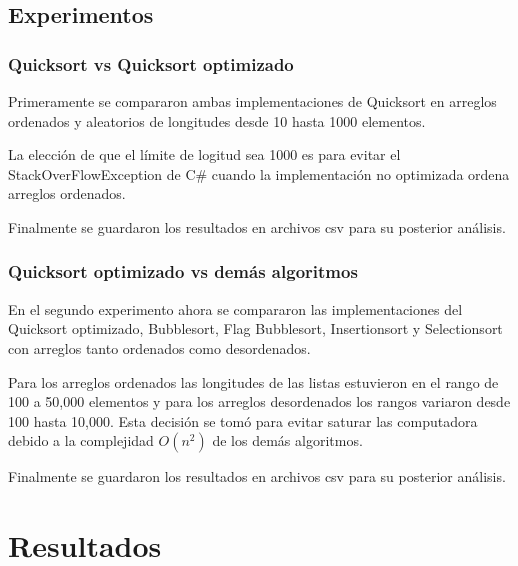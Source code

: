 \documentclass[conference]{IEEEtran}
\begin{document}
\subsection{Experimentos}
\subsubsection{Quicksort vs Quicksort optimizado}
Primeramente se compararon ambas implementaciones de Quicksort en arreglos ordenados y aleatorios de longitudes desde 10 hasta 1000 elementos.\par
La elección de que el límite de logitud sea 1000 es para evitar el StackOverFlowException de C\# cuando la implementación no optimizada ordena arreglos ordenados.\par
Finalmente se guardaron los resultados en archivos csv para su posterior análisis.



\subsubsection{Quicksort optimizado vs demás algoritmos}
En el segundo experimento ahora se compararon las implementaciones del Quicksort optimizado, Bubblesort, Flag Bubblesort, Insertionsort y Selectionsort con arreglos tanto ordenados como desordenados.\par
Para los arreglos ordenados las longitudes de las listas estuvieron en el rango de 100 a 50,000 elementos y para los arreglos desordenados los rangos variaron desde 100 hasta 10,000. Esta decisión se tomó para evitar saturar las computadora debido a la complejidad $O(n^2)$ de los demás algoritmos.\par
Finalmente se guardaron los resultados en archivos csv para su posterior análisis.



\section{Resultados}
\end{document}
